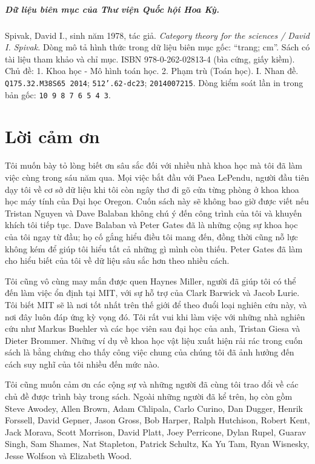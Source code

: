 \paragraph{Dữ liệu biên mục của Thư viện Quốc hội Hoa Kỳ.}
Spivak, David I., sinh năm 1978, tác giả.
\emph{Category theory for the sciences / David I. Spivak.}
Dòng mô tả hình thức trong dữ liệu biên mục gốc: ``trang; cm''.
Sách có tài liệu tham khảo và chỉ mục.
ISBN 978-0-262-02813-4 (bìa cứng, giấy kiềm).
Chủ đề: 1. Khoa học - Mô hình toán học. 2. Phạm trù (Toán học).
I. Nhan đề.
\texttt{Q175.32.M38S65 2014}; \texttt{512'.62-dc23}; \texttt{2014007215}.
\noindent Dòng kiểm soát lần in trong bản gốc: \texttt{10 9 8 7 6 5 4 3}.
\par\endgroup

\chapter*{Lời cảm ơn}
Tôi muốn bày tỏ lòng biết ơn sâu sắc đối với nhiều nhà khoa học mà tôi đã làm
việc cùng trong sáu năm qua. Mọi việc bắt đầu với Paea LePendu, người đầu tiên
dạy tôi về cơ sở dữ liệu khi tôi còn ngây thơ đi gõ cửa từng phòng ở khoa khoa
học máy tính của Đại học Oregon. Cuốn sách này sẽ không bao giờ được viết nếu
Tristan Nguyen và Dave Balaban không chú ý đến công trình của tôi và khuyến
khích tôi tiếp tục. Dave Balaban và Peter Gates đã là những cộng sự khoa học
của tôi ngay từ đầu; họ cố gắng hiểu điều tôi mang đến, đồng thời cũng nỗ lực
không kém để giúp tôi hiểu tất cả những gì mình còn thiếu. Peter Gates đã làm
cho hiểu biết của tôi về dữ liệu sâu sắc hơn theo nhiều cách.

Tôi cũng vô cùng may mắn được quen Haynes Miller, người đã giúp tôi có thể đến
làm việc ổn định tại MIT, với sự hỗ trợ của Clark Barwick và Jacob Lurie. Tôi
biết MIT sẽ là nơi tốt nhất trên thế giới để theo đuổi loại nghiên cứu này, và
nơi đây luôn đáp ứng kỳ vọng đó. Tôi rất vui khi làm việc với những nhà nghiên
cứu như Markus Buehler và các học viên sau đại học của anh, Tristan Giesa và Dieter
Brommer. Những ví dụ về khoa học vật liệu xuất hiện rải rác trong cuốn sách là
bằng chứng cho thấy công việc chung của chúng tôi đã ảnh hưởng đến cách suy
nghĩ của tôi nhiều đến mức nào.

Tôi cũng muốn cảm ơn các cộng sự và những người đã cùng tôi trao đổi về các
chủ đề được trình bày trong sách. Ngoài những người đã kể trên, họ còn gồm
Steve Awodey, Allen Brown, Adam Chlipala, Carlo Curino, Dan Dugger, Henrik
Forssell, David Gepner, Jason Gross, Bob Harper, Ralph Hutchison, Robert Kent,
Jack Morava, Scott Morrison, David Platt, Joey Perricone, Dylan Rupel, Guarav
Singh, Sam Shames, Nat Stapleton, Patrick Schultz, Ka Yu Tam, Ryan Wisnesky,
Jesse Wolfson và Elizabeth Wood.

